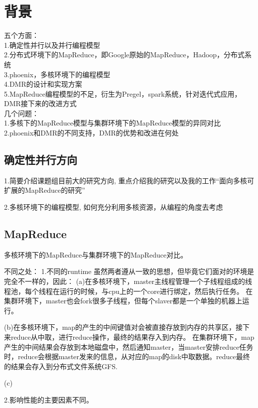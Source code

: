 \section{背景}
五个方面：\\
1.确定性并行以及并行编程模型\\
2.分布式环境下的MapReduce，即Google原始的MapReduce，Hadoop，分布式系统\\
3.phoenix，多核环境下的编程模型\\
4.DMR的设计和实现方案\\
5.MapReduce编程模型的不足，衍生为Pregel，spark系统，针对迭代式应用，DMR接下来的改进方式\\

几个问题：\\
1.多核下的MapReduce模型与集群环境下的MapReduce模型的异同对比\\
2.phoenix和DMR的不同支持，DMR的优势和改进在何处\\

\subsection{确定性并行方向}
1.简要介绍课题组目前大的研究方向, 重点介绍我的研究以及我的工作“面向多核可扩展的MapReduce的研究”

2.多核环境下的编程模型, 如何充分利用多核资源，从编程的角度去考虑





\subsection{MapReduce}
多核环境下的MapReduce与集群环境下的MapReduce对比。

不同之处：
1.不同的runtime
虽然两者遵从一致的思想，但毕竟它们面对的环境是完全不一样的，因此：
(a)在多核环境下，master主线程管理一个子线程组成的线程池，每个线程在运行的时候，与cpu上的一个core进行绑定，然后执行任务。
在集群环境下，master也会fork很多子线程，但每个slaver都是一个单独的机器上运行。

(b)在多核环境下，map的产生的中间键值对会被直接存放到内存的共享区，接下来reduce从中取，进行reduce操作，最终的结果存入到内存。
在集群环境下，map产生的中间结果会存放到本地磁盘中，然后通知master，当master安排reduce任务时，reduce会根据master发来的信息，从对应的map的disk中取数据。reduce最终的结果会存入到分布式文件系统GFS.

(c)

2.影响性能的主要因素不同。

